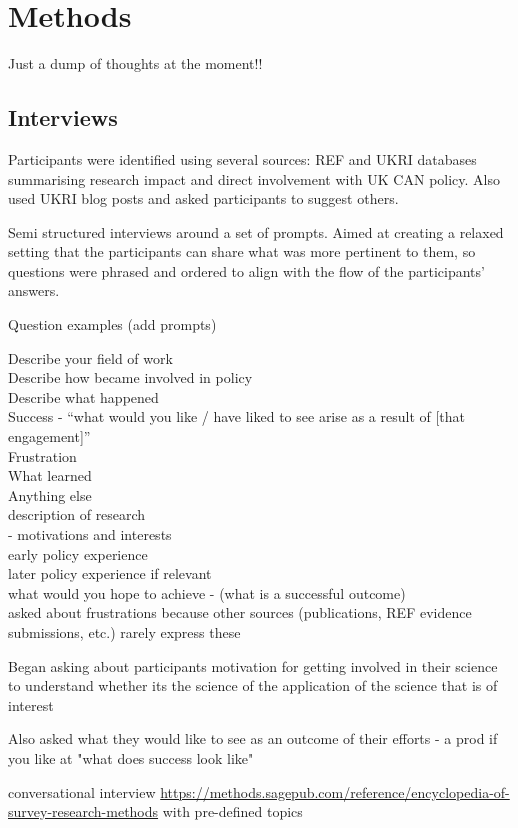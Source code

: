 \chapter{Methods}\label{ch:methods}

Just a dump of thoughts at the moment!!

\section{Interviews}
Participants were identified using several sources: REF and UKRI databases summarising research impact and direct involvement with UK CAN policy. Also used UKRI blog posts and asked participants to suggest others.

Semi structured interviews around a set of prompts. Aimed at creating a relaxed setting that the participants can share what was more pertinent to them, so questions were phrased and ordered to align with the flow of the participants' answers.

Question examples (add prompts)

Describe your field of work\\
Describe how became involved in policy\\
Describe what happened\\
Success - ``what would you like / have liked to see arise as a result of [that engagement]''\\
Frustration\\
What learned\\
Anything else\\
description of research\\
 - motivations and interests\\
early policy experience\\
later policy experience if relevant\\
what would you hope to achieve - (what is a successful outcome)\\
asked about frustrations because other sources (publications, REF evidence submissions, etc.) rarely express these

Began asking about participants motivation for getting involved in their science to understand whether its the science of the application of the science that is of interest

Also asked what they would like to see as an outcome of their efforts - a prod if you like at "what does success look like"

conversational interview \url{https://methods.sagepub.com/reference/encyclopedia-of-survey-research-methods} with pre-defined topics

